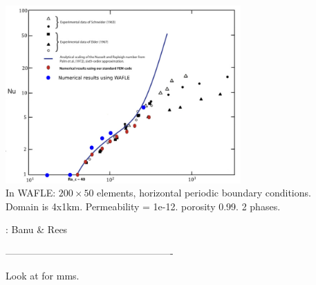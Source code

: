 \begin{center}
\includegraphics[width=9cm]{python_codes/fieldstone_107/images/NuRa2}\\
In WAFLE: $200 \times 50$ elements, horizontal periodic boundary conditions.\\ Domain is 4x1km. Permeability = 1e-12. porosity 0.99. 2 phases.  
\end{center}


\Literature: Banu \& Rees \cite{bare02}



----------------------------------------------------

Look at \textcite{buha06,buha07} for mms.
